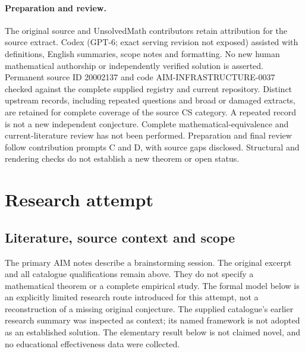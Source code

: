 \documentclass[11pt]{article}
\begin{document}
\paragraph{Preparation and review.}
The original source and UnsolvedMath contributors retain attribution for the source extract. Codex (GPT-6; exact serving revision not exposed) assisted with definitions, English summaries, scope notes and formatting. No new human mathematical authorship or independently verified solution is asserted. Permanent source ID 20002137 and code AIM-INFRASTRUCTURE-0037 checked against the complete supplied registry and current repository. Distinct upstream records, including repeated questions and broad or damaged extracts, are retained for complete coverage of the source CS category. A repeated record is not a new independent conjecture. Complete mathematical-equivalence and current-literature review has not been performed. Preparation and final review follow contribution prompts C and D, with source gaps disclosed. Structural and rendering checks do not establish a new theorem or open status.
\label{end:20002137}

\section{Research attempt}
\subsection{Literature, source context and scope}
The primary AIM notes describe a brainstorming session. The original excerpt and all catalogue qualifications remain above. They do not specify a mathematical theorem or a complete empirical study. The formal model below is an explicitly limited research route introduced for this attempt, not a reconstruction of a missing original conjecture. The supplied catalogue's earlier research summary was inspected as context; its named framework is not adopted as an established solution. The elementary result below is not claimed novel, and no educational effectiveness data were collected.
\end{document}
